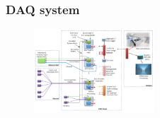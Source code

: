 \documentclass{beamer}
\begin{document}
\begin{frame}
    \frametitle{DAQ system}

  
   
       
        \begin{figure}[!h]
            \centering
         
            \includegraphics[width =0.4\textwidth]{figures/png/Screenshot_20240206_144803.png}
            \label{fig:linktodaq}
            \end{figure}
   

\end{frame}
\end{document}
